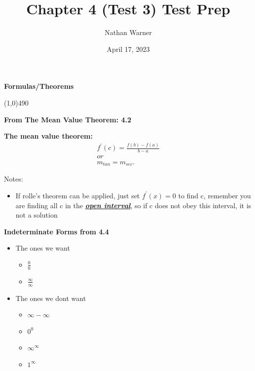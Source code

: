 \documentclass{report}
\title{\Huge{Chapter 4 (Test 3) Test Prep}}
\author{\huge{Nathan Warner}}
\date{\huge{April 17, 2023}}
\begin{document}
    \maketitle
    \begin{center}
        \begin{Large}
            \textbf{Formulas/Theorems} 
        \end{Large}
    \end{center}
    \line(1,0){490}

    \bigbreak \noindent \bigbreak \noindent 
    \begin{large}
        \textbf{From The Mean Value Theorem: 4.2}
    \end{large}
    \bigbreak \noindent 
    \textbf{The mean value theorem:}
    \begin{align*}
        f^{\prime}(c) = \frac{f(b) - f(a)}{b-a} \\
        or \\
        m_{tan} = m_{sec}
    .\end{align*}

    \bigbreak \noindent 
      \bigbreak \noindent 
     Notes:
     \begin{itemize}
       \item If rolle's theorem can be applied, just set $f^{\prime}(x) = 0$ to find c, remember you are finding all c in the \textbf{\textit{\underline{open interval}}}, so if c does not obey this interval, it is not a solution
     \end{itemize}

     \bigbreak \noindent \bigbreak \noindent 
     \begin{large}
         \textbf{Indeterminate Forms from 4.4}
     \end{large}
     \begin{itemize}
         \item The ones we want
             \begin{itemize}
                 \item $\frac{0}{0} $
                \item $\frac{\infty}{\infty}$
             \end{itemize}
        \item The ones we dont want
            \begin{itemize}
                \item $\infty -\infty$
                \item $0^{0}$
                \item $\infty^{\infty}$
                \item $1^{\infty}$
            \end{itemize}
     \end{itemize}
\end{document}
